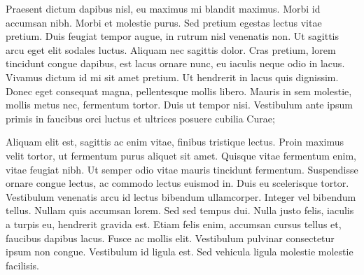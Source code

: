 
Praesent dictum dapibus nisl, eu maximus mi blandit maximus. Morbi id accumsan nibh. Morbi et molestie purus. Sed pretium egestas lectus vitae pretium. Duis feugiat tempor augue, in rutrum nisl venenatis non. Ut sagittis arcu eget elit sodales luctus. Aliquam nec sagittis dolor. Cras pretium, lorem tincidunt congue dapibus, est lacus ornare nunc, eu iaculis neque odio in lacus. Vivamus dictum id mi sit amet pretium. Ut hendrerit in lacus quis dignissim. Donec eget consequat magna, pellentesque mollis libero. Mauris in sem molestie, mollis metus nec, fermentum tortor. Duis ut tempor nisi. Vestibulum ante ipsum primis in faucibus orci luctus et ultrices posuere cubilia Curae;

Aliquam elit est, sagittis ac enim vitae, finibus tristique lectus. Proin maximus velit tortor, ut fermentum purus aliquet sit amet. Quisque vitae fermentum enim, vitae feugiat nibh. Ut semper odio vitae mauris tincidunt fermentum. Suspendisse ornare congue lectus, ac commodo lectus euismod in. Duis eu scelerisque tortor. Vestibulum venenatis arcu id lectus bibendum ullamcorper. Integer vel bibendum tellus. Nullam quis accumsan lorem. Sed sed tempus dui. Nulla justo felis, iaculis a turpis eu, hendrerit gravida est. Etiam felis enim, accumsan cursus tellus et, faucibus dapibus lacus. Fusce ac mollis elit. Vestibulum pulvinar consectetur ipsum non congue. Vestibulum id ligula est. Sed vehicula ligula molestie molestie facilisis.